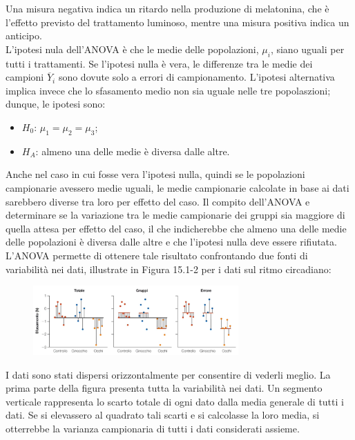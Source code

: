 \documentclass[10pt, draft]{book}
\newcounter{example}[section]
\begin{document}
\begin{example}
\begin{figure}[H]
        \caption{\small{}}
        \label{fig15.1-1}
    \end{figure}
    Una misura negativa indica un ritardo nella produzione di melatonina, che è l'effetto previsto del trattamento luminoso, mentre una misura positiva indica un anticipo.\\
    L'ipotesi nula dell'ANOVA è che le medie delle popolazioni, $\mu_i$, siano uguali per tutti i trattamenti. Se l'ipotesi nulla è vera, le differenze tra le medie dei campioni $\overline{Y}_i$ sono dovute solo a errori di campionamento. L'ipotesi alternativa implica invece che lo sfasamento medio non sia uguale nelle tre popolaszioni; dunque, le ipotesi sono:
    \begin{itemize}
        \item $H_0$: $\mu_1 = \mu_2 = \mu_3$;
        \item $H_A$: almeno una delle medie è diversa dalle altre.
    \end{itemize}
    Anche nel caso in cui fosse vera l'ipotesi nulla, quindi se le popolazioni campionarie avessero medie uguali, le medie campionarie calcolate in base ai dati sarebbero diverse tra loro per effetto del caso. Il compito dell'ANOVA e determinare se la variazione tra le medie campionarie dei gruppi sia maggiore di quella attesa per effetto del caso, il che indicherebbe che almeno una delle medie delle popolazioni è diversa dalle altre e che l'ipotesi nulla deve essere rifiutata.\\
    L'ANOVA permette di ottenere tale risultato confrontando due fonti di variabilità nei dati, illustrate in Figura 15.1-2 per i dati sul ritmo circadiano:
    \begin{figure}[H]
        \centering
        \includegraphics[width=0.7\textwidth]{fig15.1-2}
        \caption{\small{}}
        \label{fig15.1-2}
    \end{figure}
    I dati sono stati dispersi orizzontalmente per consentire di vederli meglio. La prima parte della figura presenta tutta la variabilità nei dati. Un segmento verticale rappresenta lo scarto totale di ogni dato dalla media generale di tutti i dati. Se si elevassero al quadrato tali scarti e si calcolasse la loro media, si otterrebbe la varianza campionaria di tutti i dati considerati assieme.\\
\end{example}
\end{document}

